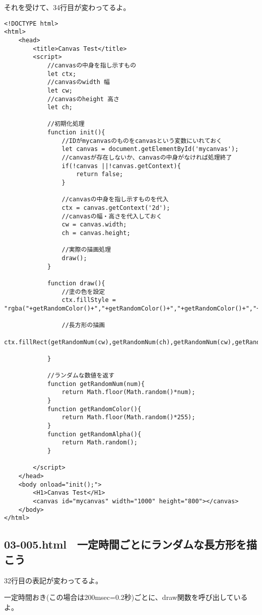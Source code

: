\documentclass[mingoth,11pt,a4j,uplatex]{jsarticle}
\begin{document}
それを受けて、34行目が変わってるよ。
\begin{lstlisting}[caption=リロードする度に色違いのランダムな長方形を描こう]
<!DOCTYPE html>
<html>
	<head>
		<title>Canvas Test</title>
		<script>
			//canvasの中身を指し示すもの
			let ctx;
			//canvasのwidth 幅
			let cw;
			//canvasのheight 高さ
			let ch;
			
			//初期化処理
			function init(){
				//IDがmycanvasのものをcanvasという変数にいれておく
				let canvas = document.getElementById('mycanvas');
				//canvasが存在しないか、canvasの中身がなければ処理終了
				if(!canvas ||!canvas.getContext){
					return false;
				}
				
				//canvasの中身を指し示すものを代入
				ctx = canvas.getContext('2d');
				//canvasの幅・高さを代入しておく
				cw = canvas.width;
				ch = canvas.height;
				
				//実際の描画処理
				draw();
			}
			
			function draw(){
				//塗の色を設定
				ctx.fillStyle = "rgba("+getRandomColor()+","+getRandomColor()+","+getRandomColor()+","+getRandomAlpha()+")";
				
				//長方形の描画
				ctx.fillRect(getRandomNum(cw),getRandomNum(ch),getRandomNum(cw),getRandomNum(ch));

			}
			
			//ランダムな数値を返す
			function getRandomNum(num){
				return Math.floor(Math.random()*num);
			}
			function getRandomColor(){
				return Math.floor(Math.random()*255);
			}
			function getRandomAlpha(){
				return Math.random();
			}

		</script>
	</head>
	<body onload="init();">
		<H1>Canvas Test</H1>
		<canvas id="mycanvas" width="1000" height="800"></canvas>
	</body>
</html>
\end{lstlisting}

\subsection{03-005.html　一定時間ごとにランダムな長方形を描こう}
32行目の表記が変わってるよ。

一定時間おき(この場合は200msec=0.2秒)ごとに、draw関数を呼び出しているよ。
\end{document}
